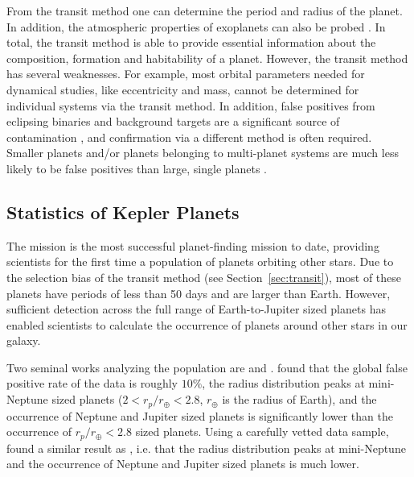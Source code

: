 From the transit method one can determine the period and radius of the planet. 
In addition, the atmospheric properties of exoplanets can also be probed \citep{Kreidberg2014, Tsiaras2016, Stevenson2016}.
In total, the transit method is able to provide essential information about the composition, formation and habitability of a planet. 
However, the transit method has several weaknesses. 
For example, most orbital parameters needed for dynamical studies, like eccentricity and mass, cannot be determined for individual systems via the transit method.
In addition, false positives from eclipsing binaries and background targets are a significant source of contamination \citep{Fressin2013}, and confirmation via a different method is often required. 
Smaller planets and/or planets belonging to multi-planet systems are much less likely to be false positives than large, single planets \citep{Fressin2013}.

\subsection{Statistics of Kepler Planets}
\label{sec:stats}
The \kep mission is the most successful planet-finding mission to date, providing scientists for the first time a population of planets orbiting other stars. 
Due to the selection bias of the transit method (see Section~\ref{sec:transit}), most of these planets have periods of less than 50 days and are larger than Earth. 
However, sufficient detection across the full range of Earth-to-Jupiter sized planets has enabled scientists to calculate the occurrence of planets around other stars in our galaxy. 

Two seminal works analyzing the \kep population are \citet{Fressin2013} and \citet{Petigura2013}.
\citet{Fressin2013} found that the global false positive rate of the \kep data is roughly $10\%$, the radius distribution peaks at mini-Neptune sized planets ($2<r_p/r_{\oplus}<2.8$, $r_{\oplus}$ is the radius of Earth), and the occurrence of Neptune and Jupiter sized planets is significantly lower than the occurrence of $r_p/r_{\oplus}<2.8$ sized planets.
Using a carefully vetted data sample, \citet{Petigura2013} found a similar result as \citet{Fressin2013}, i.e. that the radius distribution peaks at mini-Neptune and the occurrence of Neptune and Jupiter sized planets is much lower.

